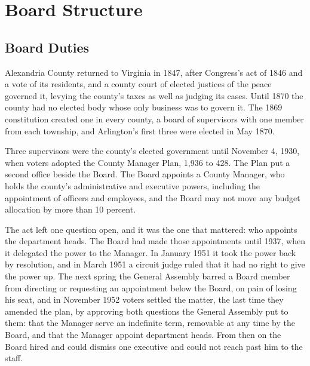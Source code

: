 \section{Board Structure}

\subsection{Board Duties}

Alexandria County returned to Virginia in 1847, after Congress's act of 1846 and
a vote of its residents, and a county court of elected justices of the peace
governed it, levying the county's taxes as well as judging its
cases.\autocite{usstat1846retrocession}\fnsep\autocite[ch.~53, secs.~1 and 3]{vacode1860}
Until 1870 the county had no elected body whose only business was to govern it.
The 1869 constitution created one in every county, a board of supervisors with
one member from each township,\autocite[art.~VII, sec.~2]{vaconstitution1869}
and Arlington's first three were elected in May
1870.\autocite[chs.~39, 76 and 188]{vaacts1870}

Three supervisors were the county's elected government until November 4, 1930,
when voters adopted the County Manager Plan, 1,936 to 428.\autocite[194--196]{rose1976}
The Plan put a second office beside the Board. The Board appoints a County
Manager, who holds the county's administrative and executive powers, including
the appointment of officers and employees, and the Board may not move any budget
allocation by more than 10 percent.\autocite{vaacts1930c167}

The act left one question open, and it was the one that mattered: who appoints
the department heads. The Board had made those appointments until 1937, when it
delegated the power to the Manager. In January 1951 it took the power back by
resolution, and in March 1951 a circuit judge ruled that it had no right to give
the power up.\autocite{dailysun1951spicer,sun1951rulingboard} The next spring the
General Assembly barred a Board member from directing or requesting an
appointment below the Board, on pain of losing his
seat,\autocite{vaacts1952c443} and in November 1952 voters settled the matter,
the last time they amended the plan, by approving both questions the General
Assembly put to them: that the Manager serve an indefinite term, removable at
any time by the Board, and that the Manager appoint department
heads.\autocite{vaacts1952c198,dailysun1952results} From then on the Board hired
and could dismiss one executive and could not reach past him to the staff.


